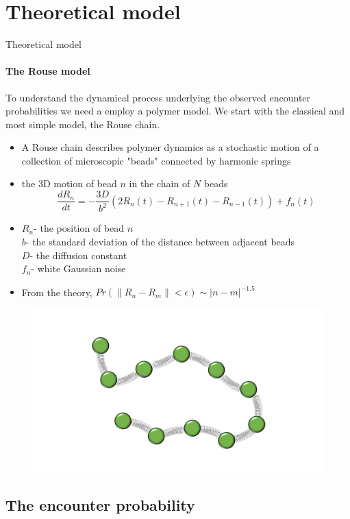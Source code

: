 \documentclass[8pt]{beamer}
\begin{document}
\section{Theoretical model}\label{section_theoreticalModel}

\begin{frame}{Theoretical model}
\framesubtitle{The Rouse model}
To understand the dynamical process underlying the observed encounter probabilities we need a employ a polymer model. We start with the classical and most simple model, the Rouse chain.
\begin{itemize}
\item A Rouse chain describes polymer dynamics as a stochastic motion of a collection of microscopic "beads" connected by harmonic springs
\item the 3D  motion of bead $n$ in the chain of $N$ beads 
\begin{equation*}
\frac{dR_n}{dt} = -\frac{3D}{b^2}(2R_n(t)-R_{n+1}(t)-R_{n-1}(t))+f_n(t)
\end{equation*}
\item $R_n$- the position of bead $n$\\
$b$- the standard deviation of the distance between adjacent beads\\
$D$- the diffusion constant\\
$f_n$- white Gaussian noise
\item From the theory, $Pr(\|R_n-R_m\|<\epsilon)\sim  |n-m|^{-1.5}$
\end{itemize}

\begin{figure}[H]
\includegraphics[scale=0.1]{RousePolymerSketch}
\end{figure}
\end{frame}

\subsection{The encounter probability}\label{subsection_theEncounterProbability}
\end{document}
